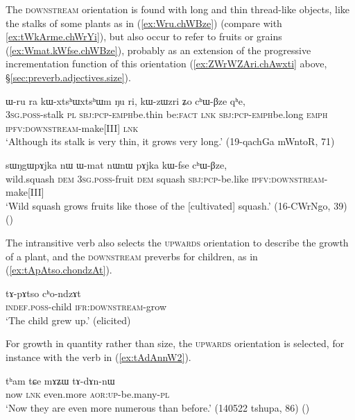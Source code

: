 The \textsc{downstream} orientation is found with long and thin thread-like objects, like the stalks of some plants as in (\ref{ex:Wru.chWBze}) (compare with \ref{ex:tWkArme.chWrYi}), but also occur to refer to fruits or grains (\ref{ex:Wmat.kWfse.chWBze}), probably as an extension of the progressive incrementation function of this orientation (\ref{ex:ZWrWZAri.chAwxti} above, §\ref{sec:preverb.adjectives.size}).

  \begin{exe}
\ex \label{ex:Wru.chWBze}
\gll   ɯ-ru ra kɯ-xtsʰɯ\redp{}xtsʰɯm ŋu ri, kɯ-zɯ\redp{}zri ʑo cʰɯ-βze qʰe,  \\
  \textsc{3sg}.\textsc{poss}-stalk \textsc{pl} \textsc{sbj}:\textsc{pcp}-\textsc{emph}\redp{}be.thin be:\textsc{fact} \textsc{lnk}  \textsc{sbj}:\textsc{pcp}-\textsc{emph}\redp{}be.long \textsc{emph} \textsc{ipfv}:\textsc{downstream}-make[III] \textsc{lnk} \\
\glt `Although its stalk is very thin, it grows very long.' (19-qachGa mWntoR, 71)
  \end{exe}
  
\begin{exe}
\ex \label{ex:Wmat.kWfse.chWBze}
\gll    sɯŋgɯpɤjka nɯ ɯ-mat nɯnɯ pɤjka kɯ-fse cʰɯ-βze,    \\
wild.squash \textsc{dem} \textsc{3sg}.\textsc{poss}-fruit \textsc{dem} squash \textsc{sbj}:\textsc{pcp}-be.like \textsc{ipfv}:\textsc{downstream}-make[III] \\
\glt `Wild squash grows fruits like those of the [cultivated] squash.' (16-CWrNgo, 39)
()
\end{exe}

The intransitive verb  also selects the \textsc{upwards} orientation to describe the growth of a plant, and the \textsc{downstream} preverbs for children, as in (\ref{ex:tApAtso.chondzAt}).

\begin{exe}
\ex \label{ex:tApAtso.chondzAt}
\gll   tɤ-pɤtso cʰo-ndzɤt \\
\textsc{indef}.\textsc{poss}-child \textsc{ifr}:\textsc{downstream}-grow \\
\glt  `The child grew up.' (elicited)
\end{exe}

For growth in quantity rather than size, the \textsc{upwards} orientation is selected, for instance with the verb  in (\ref{ex:tAdAnnW2}).

\begin{exe}
\ex \label{ex:tAdAnnW2}
\gll  tʰam tɕe mɤʑɯ tɤ-dɤn-nɯ  \\
now \textsc{lnk} even.more \textsc{aor}:\textsc{up}-be.many-\textsc{pl}  \\
\glt `Now they are even more numerous than before.' (140522 tshupa, 86) ()
\end{exe}

